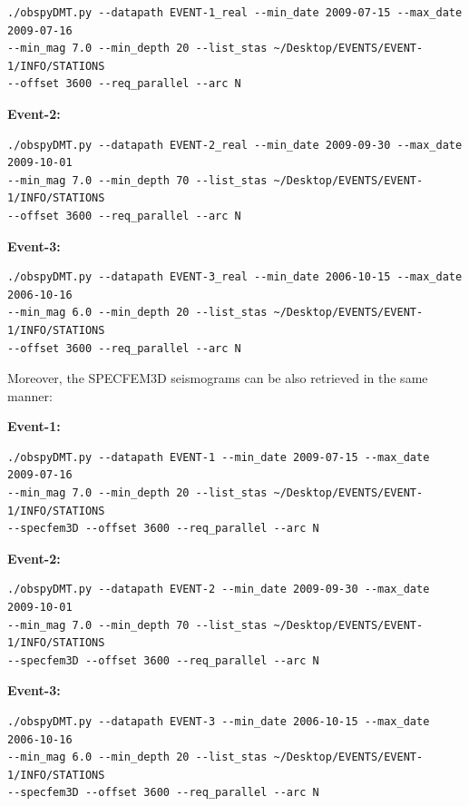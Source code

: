 \documentclass{article}
\begin{document}
\begin{lstlisting}
./obspyDMT.py --datapath EVENT-1_real --min_date 2009-07-15 --max_date 2009-07-16 
--min_mag 7.0 --min_depth 20 --list_stas ~/Desktop/EVENTS/EVENT-1/INFO/STATIONS 
--offset 3600 --req_parallel --arc N
\end{lstlisting}

\textbf{Event-2:}

\begin{lstlisting}
./obspyDMT.py --datapath EVENT-2_real --min_date 2009-09-30 --max_date 2009-10-01 
--min_mag 7.0 --min_depth 70 --list_stas ~/Desktop/EVENTS/EVENT-1/INFO/STATIONS 
--offset 3600 --req_parallel --arc N
\end{lstlisting}

\textbf{Event-3:}

\begin{lstlisting}
./obspyDMT.py --datapath EVENT-3_real --min_date 2006-10-15 --max_date 2006-10-16 
--min_mag 6.0 --min_depth 20 --list_stas ~/Desktop/EVENTS/EVENT-1/INFO/STATIONS 
--offset 3600 --req_parallel --arc N
\end{lstlisting}

Moreover, the SPECFEM3D seismograms can be also retrieved in the same manner:

\textbf{Event-1:}

\begin{lstlisting}
./obspyDMT.py --datapath EVENT-1 --min_date 2009-07-15 --max_date 2009-07-16 
--min_mag 7.0 --min_depth 20 --list_stas ~/Desktop/EVENTS/EVENT-1/INFO/STATIONS 
--specfem3D --offset 3600 --req_parallel --arc N
\end{lstlisting}

\textbf{Event-2:}

\begin{lstlisting}
./obspyDMT.py --datapath EVENT-2 --min_date 2009-09-30 --max_date 2009-10-01 
--min_mag 7.0 --min_depth 70 --list_stas ~/Desktop/EVENTS/EVENT-1/INFO/STATIONS 
--specfem3D --offset 3600 --req_parallel --arc N
\end{lstlisting}

\textbf{Event-3:}

\begin{lstlisting}
./obspyDMT.py --datapath EVENT-3 --min_date 2006-10-15 --max_date 2006-10-16 
--min_mag 6.0 --min_depth 20 --list_stas ~/Desktop/EVENTS/EVENT-1/INFO/STATIONS 
--specfem3D --offset 3600 --req_parallel --arc N
\end{lstlisting}
\end{document}
